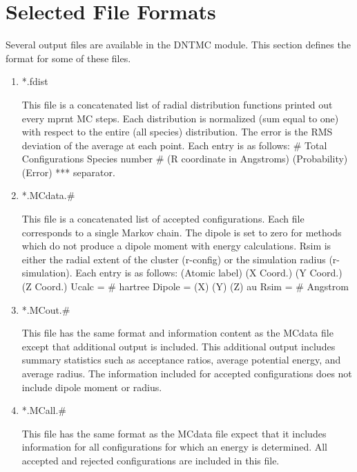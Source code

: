 \section{Selected File Formats}
Several output files are available in the DNTMC module.  This
section defines the format for some of these files.

\begin{enumerate}
\item *.fdist

This file is a concatenated list of radial distribution functions
printed out every mprnt MC steps.  Each distribution is normalized
(sum equal to one) with respect to the entire (all species)
distribution.  The error is the RMS deviation of the average at each
point.  Each entry is as follows: \subitem [1] \# Total
Configurations \subitem [2] Species number \# \subitem [3](R
coordinate in Angstroms) (Probability) (Error)   \subitem [4]
*** separator.

\item *.MCdata.\#

This file is a concatenated list of accepted configurations. Each
file corresponds to a single Markov chain.  The dipole is set to
zero for methods which do not produce a dipole moment with energy
calculations.  Rsim is either the radial extent of the cluster
(r-config) or the simulation radius (r-simulation).
 Each entry is as follows: \subitem [1] (Atomic label) (X Coord.) (Y
Coord.) (Z Coord.)  \subitem [2] Ucalc = \#
hartree \subitem [3] Dipole = (X) (Y) (Z) au \subitem [4] Rsim = \#
Angstrom 

\item *.MCout.\#

This file has the same format and information content as the MCdata
file except that additional output is included.  This additional
output includes summary statistics such as acceptance ratios,
average potential energy, and average radius.  The information
included for accepted configurations does not include dipole moment
or radius.

\item *.MCall.\#

This file has the same format as the MCdata file expect that it
includes information for all configurations for which an energy is
determined.  All accepted and rejected configurations are included
in this file.


\end{enumerate}
